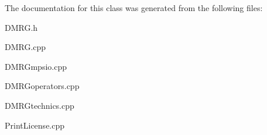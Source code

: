 The documentation for this class was generated from the following files\-:\begin{DoxyCompactItemize}
\item 
D\-M\-R\-G.\-h\item 
D\-M\-R\-G.\-cpp\item 
D\-M\-R\-Gmpsio.\-cpp\item 
D\-M\-R\-Goperators.\-cpp\item 
D\-M\-R\-Gtechnics.\-cpp\item 
Print\-License.\-cpp\end{DoxyCompactItemize}
